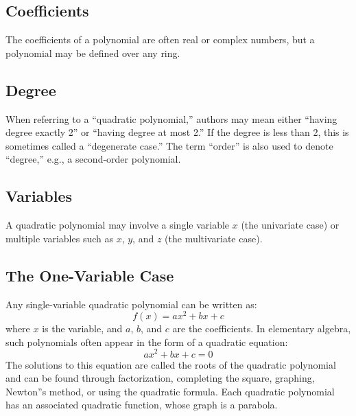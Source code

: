 \subsection{Coefficients}
\label{sss:coef-f6ff}

The coefficients of a polynomial are often real or complex numbers, but a polynomial may
be defined over any ring.

\subsection{Degree}
\label{sss:degr-fb81}

When referring to a ``quadratic polynomial,'' authors may mean either ``having degree
exactly 2'' or ``having degree at most 2.'' If the degree is less than 2, this is
sometimes called a ``degenerate case.'' The term ``order'' is also used to denote
``degree,'' e.g., a second-order polynomial.

\subsection{Variables}
\label{sss:vari-87cd}

A quadratic polynomial may involve a single variable $x$ (the univariate case) or multiple variables such as $x$, $y$, and $z$ (the multivariate case).

\subsection{The One-Variable Case}
\label{sss:theo-63b6}

Any single-variable quadratic polynomial can be written as:
\[
f(x) = ax^2 + bx + c
\]
where $x$ is the variable, and $a$, $b$, and $c$ are the coefficients. In elementary algebra, such polynomials often appear in the form of a quadratic equation:
\[
ax^2 + bx + c = 0
\]
The solutions to this equation are called the roots of the quadratic polynomial and can be
found through factorization, completing the square, graphing, Newton''s method, or using
the quadratic formula. Each quadratic polynomial has an associated quadratic function,
whose graph is a parabola.

